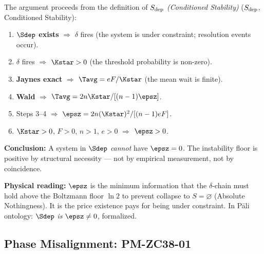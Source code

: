 \documentclass[12pt, a4paper]{article}
\begin{document}
\begin{derivedbox}[title={FIND-ZC38-03: $\Sdep$ Necessitates $\epsz > 0$}]
\sloppy
The argument proceeds from the definition of \emph{$S_{\rm dep}$ (Conditioned Stability)}
($S_{\rm dep}$, Conditioned Stability):

\medskip
\begin{enumerate}[leftmargin=*,noitemsep]
  \item \textbf{$\Sdep$ exists} $\Rightarrow$ $\delta$ fires
    (the system is under constraint; resolution events occur).
  \item $\delta$ fires $\Rightarrow$ $\Kstar > 0$
    (the threshold probability is non-zero).
  \item \textbf{Jaynes exact} $\Rightarrow$ $\Tavg = eF/\Kstar$
    (the mean wait is finite).
  \item \textbf{Wald} $\Rightarrow$ $\Tavg = 2n\Kstar/[(n-1)\epsz]$.
  \item Steps 3--4 $\Rightarrow$
    $\epsz = 2n(\Kstar)^2/[(n-1)eF]$.
  \item $\Kstar > 0$, $F > 0$, $n > 1$, $e > 0$
    $\Rightarrow$ \textbf{$\epsz > 0$}.
\end{enumerate}

\medskip
\textbf{Conclusion:} A system in $\Sdep$ \emph{cannot} have $\epsz = 0$.
The instability floor is positive by structural necessity ---
not by empirical measurement, not by coincidence.

\medskip
\textbf{Physical reading:}
$\epsz$ is the minimum information that the $\delta$-chain must hold
above the Boltzmann floor $\ln 2$ to prevent collapse to
$S = \varnothing$ (Absolute Nothingness).
It is the price existence pays for being under constraint.
In P\=ali ontology: $\Sdep$ \emph{is} $\epsz \neq 0$, formalized.
\end{derivedbox}

\subsection{Phase Misalignment: PM-ZC38-01}
\label{sec:pm}
\end{document}
